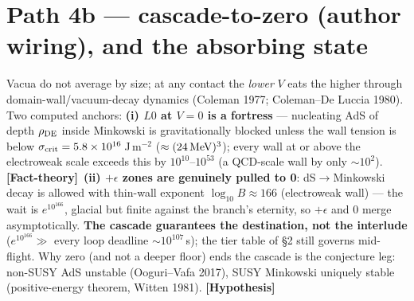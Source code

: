 \documentclass[11pt]{article}
\newcommand{\factth}{\textcolor{green!40!black}{\textbf{[Fact-theory]}}}
\newcommand{\hyp}{\textcolor{orange!80!black}{\textbf{[Hypothesis]}}}
\begin{document}
\section{Path 4b --- cascade-to-zero (author wiring), and the absorbing state}
Vacua do not average by size; at any contact the \emph{lower} $V$ eats the higher through domain-wall/vacuum-decay dynamics (Coleman 1977; Coleman--De Luccia 1980). Two computed anchors: \textbf{(i) $L0$ at $V=0$ is a fortress} --- nucleating AdS of depth $\rho_{\rm DE}$ inside Minkowski is gravitationally blocked unless the wall tension is below $\sigma_{\rm crit}=5.8\times10^{16}$\,J\,m$^{-2}$ ($\approx(24\,{\rm MeV})^3$); every wall at or above the electroweak scale exceeds this by $10^{10}$--$10^{53}$ (a QCD-scale wall by only $\sim\!10^{2}$). \factth\ \textbf{(ii) $+\epsilon$ zones are genuinely pulled to 0}: dS$\to$Minkowski decay is allowed with thin-wall exponent $\log_{10}B\approx166$ (electroweak wall) --- the wait is $e^{10^{166}}$, glacial but finite against the branch's eternity, so $+\epsilon$ and $0$ merge asymptotically. \textbf{The cascade guarantees the destination, not the interlude} ($e^{10^{166}}\gg$ every loop deadline $\sim10^{107}$\,s); the tier table of \S2 still governs mid-flight. Why zero (and not a deeper floor) ends the cascade is the conjecture leg: non-SUSY AdS unstable (Ooguri--Vafa 2017), SUSY Minkowski uniquely stable (positive-energy theorem, Witten 1981). \hyp
\end{document}
